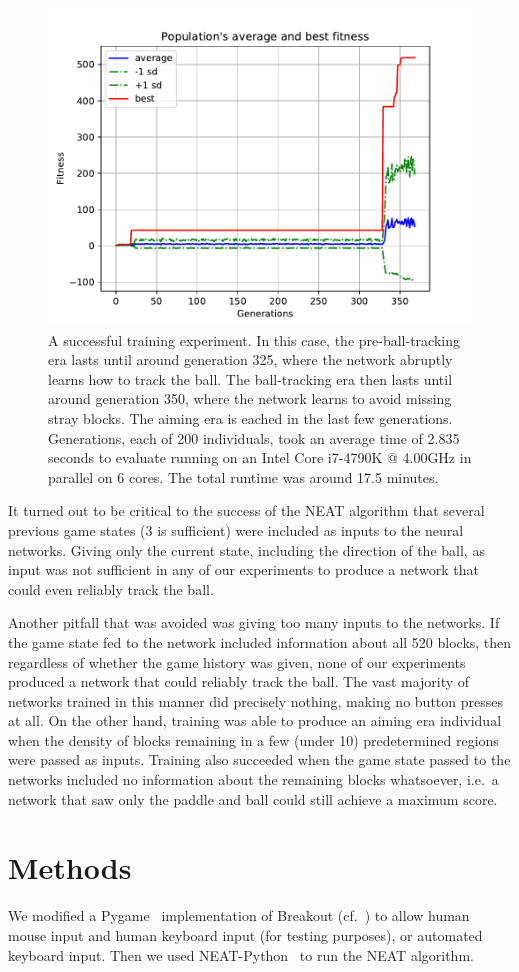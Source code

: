 \documentclass[letterpaper, twocolumn, conference]{article}
\begin{document}
\begin{figure}[h!]
    \centering
    \includegraphics[width=.54 \textwidth]{avg_fitness.pdf}
    \caption{A successful training experiment. In this case, the pre-ball-tracking era lasts
        until around generation 325, where the network abruptly learns how to track the ball.
        The ball-tracking era then lasts until around generation 350, where the network learns to avoid missing stray blocks. The aiming era is eached in the last few generations.
        Generations, each of 200 individuals, took an average time of 2.835 seconds to evaluate running on an
        Intel Core i7-4790K @ 4.00GHz in parallel on 6 cores. The total runtime was around 17.5 minutes.}
\end{figure}

It turned out to be critical to the success of the NEAT algorithm that several previous game states (3 is sufficient) were included as inputs to the neural networks.
Giving only the current state, including the direction of the ball, as input was not sufficient in any
of our experiments to produce a network that could even reliably track the ball.

Another pitfall that was avoided was giving too many inputs to the networks.
If the game state fed to the network
included information about all 520 blocks, then regardless of whether the game history was given,
none of our experiments produced a network that could reliably track the ball.
The vast majority of networks trained in this manner did precisely nothing, making no button presses
at all.
On the other hand, training was able to produce an aiming era individual
when the density of blocks remaining in a few (under 10) predetermined regions were passed as inputs.
Training also succeeded when the game state passed to the networks included no information about the remaining blocks whatsoever, i.e.\ a network that saw only the paddle and ball could still achieve a maximum score.

\section{Methods}
We modified a Pygame~\cite{pygame} implementation of Breakout (cf.~\cite{max00355breakout}) to allow
human mouse input and human keyboard input (for testing purposes), or automated keyboard input.
Then we used NEAT-Python~\cite{neatpython} to run the NEAT algorithm.
\end{document}
